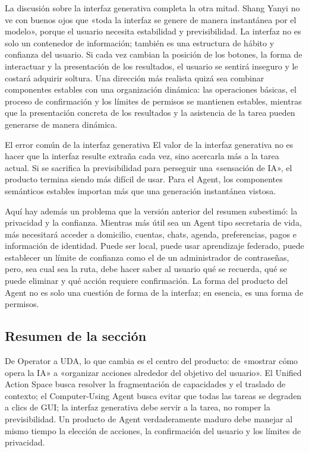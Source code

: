 La discusión sobre la interfaz generativa completa la otra mitad. Shang Yanyi no ve con buenos ojos que «toda la interfaz se genere de manera instantánea por el modelo», porque el usuario necesita estabilidad y previsibilidad. La interfaz no es solo un contenedor de información; también es una estructura de hábito y confianza del usuario. Si cada vez cambian la posición de los botones, la forma de interactuar y la presentación de los resultados, el usuario se sentirá inseguro y le costará adquirir soltura. Una dirección más realista quizá sea combinar componentes estables con una organización dinámica: las operaciones básicas, el proceso de confirmación y los límites de permisos se mantienen estables, mientras que la presentación concreta de los resultados y la asistencia de la tarea pueden generarse de manera dinámica.

\begin{warningbox}{El error común de la interfaz generativa}
El valor de la interfaz generativa no es hacer que la interfaz resulte extraña cada vez, sino acercarla más a la tarea actual. Si se sacrifica la previsibilidad para perseguir una «sensación de IA», el producto termina siendo más difícil de usar. Para el Agent, los componentes semánticos estables importan más que una generación instantánea vistosa.
\end{warningbox}

Aquí hay además un problema que la versión anterior del resumen subestimó: la privacidad y la confianza. Mientras más útil sea un Agent tipo secretaria de vida, más necesitará acceder a domicilio, cuentas, chats, agenda, preferencias, pagos e información de identidad. Puede ser local, puede usar aprendizaje federado, puede establecer un límite de confianza como el de un administrador de contraseñas, pero, sea cual sea la ruta, debe hacer saber al usuario qué se recuerda, qué se puede eliminar y qué acción requiere confirmación. La forma del producto del Agent no es solo una cuestión de forma de la interfaz; en esencia, es una forma de permisos.

\subsection{Resumen de la sección}

De Operator a UDA, lo que cambia es el centro del producto: de «mostrar cómo opera la IA» a «organizar acciones alrededor del objetivo del usuario». El Unified Action Space busca resolver la fragmentación de capacidades y el traslado de contexto; el Computer-Using Agent busca evitar que todas las tareas se degraden a clics de GUI; la interfaz generativa debe servir a la tarea, no romper la previsibilidad. Un producto de Agent verdaderamente maduro debe manejar al mismo tiempo la elección de acciones, la confirmación del usuario y los límites de privacidad.
